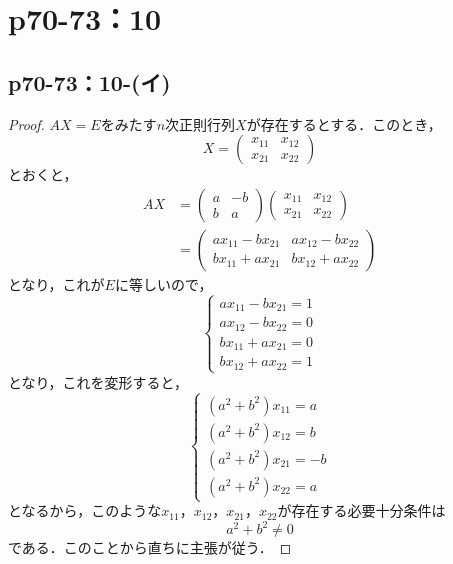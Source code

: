 \documentclass[a4paper,10pt,fleqn]{ltjsarticle}
\begin{document}
\newpage


\section*{p70-73：10}

\subsection*{p70-73：10-(イ)}

\begin{tleftbar}
    \begin{proof}
        $AX=E$をみたす$n$次正則行列$X$が存在するとする．このとき，
        \[
            X = \begin{pmatrix} x_{11} & x_{12} \\ x_{21} & x_{22} \end{pmatrix}
        \]
        とおくと，
        \begin{align*}
            AX & = \begin{pmatrix} a & -b \\ b & a \end{pmatrix} \begin{pmatrix} x_{11} & x_{12} \\ x_{21} & x_{22} \end{pmatrix} \\
               & = \begin{pmatrix} ax_{11}-bx_{21} & ax_{12}-bx_{22} \\ bx_{11}+ax_{21} & bx_{12}+ax_{22} \end{pmatrix}
        \end{align*}
        となり，これが$E$に等しいので，
        \[
            \begin{cases}
                ax_{11}-bx_{21} =1 \\
                ax_{12}-bx_{22} =0 \\
                bx_{11}+ax_{21} =0 \\
                bx_{12}+ax_{22} =1
            \end{cases}
        \]
        となり，これを変形すると，
        \[
            \begin{cases}
                (a^2+b^2) x_{11} = a \\
                (a^2+b^2) x_{12} = b \\
                (a^2+b^2) x_{21}=-b  \\
                (a^2+b^2) x_{22} = a
            \end{cases}
        \]
        となるから，このような$x_{11}$，$x_{12}$，$x_{21}$，$x_{22}$が存在する必要十分条件は
        \[
            a^2 + b^2 \ne 0
        \]
        である．このことから直ちに主張が従う．
    \end{proof}
\end{tleftbar}
\end{document}
